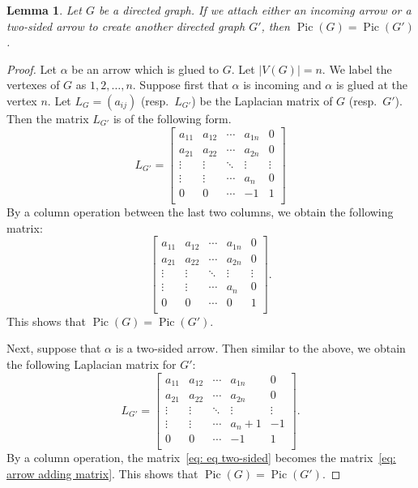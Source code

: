 \documentclass[11pt,reqno]{amsart}
\DeclareMathOperator{\Pic}{Pic}
\theoremstyle{definition}
\theoremstyle{plain}
\newtheorem{lem}[mydef]{Lemma}
\begin{document}
\begin{lem}\label{proposition: gluing an arrow proposition}
Let $G$ be a directed graph. If we attach either an incoming arrow or a two-sided arrow to create another directed graph $G'$, then $\Pic(G)=\Pic(G')$.
\end{lem}
\begin{proof}
Let $\alpha$ be an arrow which is glued to $G$. Let $|V(G)|=n$. We label the vertexes of $G$ as $1,2,\dots,n$. Suppose first that $\alpha$ is incoming and $\alpha$ is glued at the vertex $n$. Let $L_G=(a_{ij})$ (resp.~$L_{G'}$) be the Laplacian matrix of $G$ (resp.~$G'$). 
Then the matrix $L_{G'}$ is of the following form.
\begin{equation}
L_{G'}=\left[\begin{array}{ccc|c|c}
a_{11}&a_{12}&\cdots &a_{1n}&0\\
a_{21}&a_{22}&\cdots &a_{2n}&0\\
\vdots & \vdots &\ddots & \vdots & \vdots \\ \hline
\vdots & \vdots & \cdots&a_n & 0\\ \hline
0&0&\cdots &-1&1\\
\end{array}\right]
\end{equation}
By a column operation between the last two columns, we obtain the following matrix:
\begin{equation}\label{eq: arrow adding matrix}
\left[\begin{array}{ccc|c|c}
a_{11}&a_{12}&\cdots &a_{1n}&0\\
a_{21}&a_{22}&\cdots &a_{2n}&0\\
\vdots & \vdots &\ddots & \vdots & \vdots \\ \hline
\vdots & \vdots & \cdots&a_n & 0\\ \hline
0&0&\cdots &0&1\\
\end{array}\right].
\end{equation}
This shows that $\Pic(G)=\Pic(G')$.

Next, suppose that $\alpha$ is a two-sided arrow. Then similar to the above, we obtain the following Laplacian matrix for $G'$:
\begin{equation}\label{eq: eq two-sided}
L_{G'}=\left[\begin{array}{ccc|c|c}
a_{11}&a_{12}&\cdots &a_{1n}&0\\
a_{21}&a_{22}&\cdots &a_{2n}&0\\
\vdots & \vdots &\ddots & \vdots & \vdots \\ \hline
\vdots & \vdots & \cdots&a_n+1 & -1\\ \hline
0&0&\cdots &-1&1\\
\end{array}\right].
\end{equation}
By a column operation, the matrix~\eqref{eq: eq two-sided} becomes the matrix~\eqref{eq: arrow adding matrix}.
This shows that $\Pic(G)=\Pic(G')$.
\end{proof}
\end{document}
